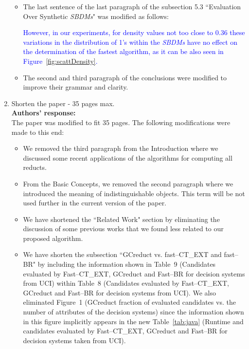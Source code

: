 \documentclass{letter}
\begin{document}
\begin{letter}{}
\begin{enumerate}
\begin{itemize}
		\item The last sentence of the last paragraph of the subsection 5.3 ``Evaluation Over Synthetic \textit{SBDMs}" was modified as follows:
		
		\textcolor{blue}{However, in our experiments, for density values not too close to 0.36 these variations in the distribution of 1's within the \textit{SBDMs} have no effect on the determination of the fastest algorithm, as it can be also seen in Figure~\ref{fig:scattDensity}.}
		
		\item The second and third paragraph of the conclusions were modified to improve their grammar and clarity.
		
	\end{itemize}
		 
	\item Shorten the paper - 35 pages max.\\
	\textbf{Authors’ response:} \\
	The paper was modified to fit 35 pages. The following modifications were made to this end:
	\begin{itemize}
		\item We removed the third paragraph from the Introduction where we discussed some recent applications of the algorithms for computing all reducts.
		
		\item From the  Basic Concepts, we removed the second paragraph where we introduced the meaning of indistinguishable objects. This term will be not used further in the current version of the paper.

		
		\item We have shortened the ``Related Work" section by eliminating the discussion of some previous works that we found less related to our proposed algorithm.
		
		
		\item We have shorten the subsection ``GCreduct vs. fast--CT\_EXT and fast--BR" by including the information shown in Table~9 (Candidates evaluated by Fast--CT\_EXT, GCreduct and Fast--BR for decision systems from UCI) within Table~8 (Candidates evaluated by Fast--CT\_EXT, GCreduct and Fast--BR for decision systems from UCI). We also eliminated Figure~1 (GCreduct fraction of evaluated candidates vs. the number of attributes of the decision systems) since the information shown in this figure implicitly appears in the new Table~\ref{tab:java} (Runtime and candidates evaluated by Fast--CT\_EXT, GCreduct and Fast--BR for decision systems taken from UCI).
		

\end{itemize}
\end{enumerate}
\end{letter}
\end{document}
